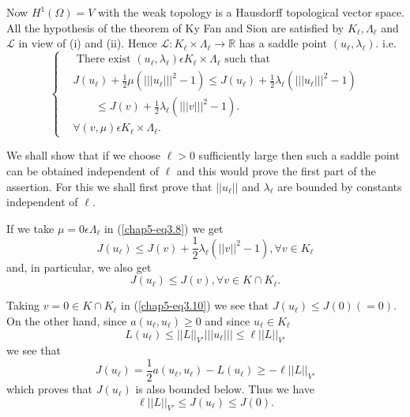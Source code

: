 Now $H^{1} (\Omega) = V$ with the weak topology is a Hausdorff topological vector space. All the hypothesis of the theorem of Ky Fan and Sion are satisfied by $K_{\ell}, \Lambda_{\ell}$ and $\mathscr{L}$ in view of (i) and (ii). Hence $\mathscr{L} : K_{\ell} \times \Lambda_\ell \to \mathbb{R}$ has a saddle point $(u_{\ell}, \lambda_{\ell})$. i.e. 
\begin{equation*}
\begin{cases}
& \text{ There exist } (u_{\ell}, \lambda_{\ell}) \epsilon K_{\ell} \times \Lambda_{\ell} \text{ such that }\\
& J(u_{\ell}) + \frac{1}{2} \mu (|||u_{\ell}|||^{2} - 1) \leq
  J(u_{\ell}) + \frac{1}{2} \lambda_{\ell} (|||u_{\ell}|||^{2}  - 1)\\
&\qquad\leq J(v) + \frac{1}{2} \lambda_{\ell} (|||v|||^{2} - 1).\\
& \forall (v, \mu) \epsilon K_{\ell} \times \Lambda_{\ell}.\tag{3.8}\label{chap5-eq3.8}
\end{cases}
\end{equation*}

We shall show that if we choose $\ell > 0$ sufficiently large then such a saddle point can be obtained independent of $\ell$ and this would prove the first part of the assertion. For this we shall first prove that $||u_{\ell}||$ and $\lambda_{\ell}$ are bounded by constants independent of $\ell$.

If we take $\mu = 0 \epsilon \Lambda_{\ell}$ in (\ref{chap5-eq3.8}) we get
\begin{equation*}
J(u_{\ell}) \leq J(v) + \frac{1}{2} \lambda_{\ell} (||v||^{2} - 1), \forall v \in K_{\ell}\tag{3.9}\label{chap5-eq3.9}
\end{equation*}\pageoriginale
and, in particular, we also get
\begin{equation*}
J(u_{\ell}) \leq J(v), \forall v \in K \cap K_{\ell}.\tag{3.10}\label{chap5-eq3.10}
\end{equation*}

Taking $v = 0 \in K \cap K_{\ell}$ in (\ref{chap5-eq3.10}) we see that $J(u_{\ell}) \leq J(0)  (=0)$. On the other hand, since $a(u_{\ell}, u_{\ell}) \geq 0$ and since $u_{\ell} \in K_{\ell}$
$$
L(u_{\ell}) \leq ||L||_{V'} |||u_{\ell}||| \leq \ell ||L||_{V'}
$$
we see that
$$
J(u_{\ell}) = \frac{1}{2} a(u_{\ell}, u_{\ell}) - L(u_{\ell}) \geq -\ell ||L||_{V'}
$$
which proves that $J(u_{\ell})$ is also bounded below. Thus we have
\begin{equation*}
\ell ||L||_{V'} \leq J(u_{\ell}) \leq J(0).\tag{3.11}\label{chap5-eq3.11}
\end{equation*}


